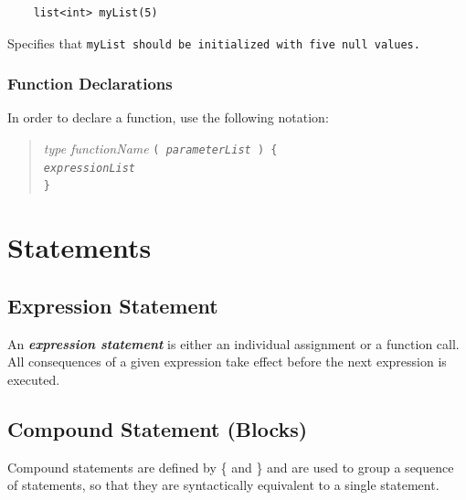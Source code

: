 \documentclass{article}
\begin{document}
\begin{verbatim}
    list<int> myList(5)
\end{verbatim}

Specifies that \tt myList \rm should be initialized with five \tt null \rm values.


\subsubsection{Function Declarations} %
\label{ssub:function_declarations}

In order to declare a function, use the following notation:

\begin{quotation}
\emph{type functionName} \tt ( \rm \emph{parameterList} \tt ) \{ \rm \\
\indent \indent \emph{expressionList} \\
\indent \tt \}
\end{quotation}





\section{Statements} %
\label{sec:statements}

\subsection{Expression Statement} %
\label{sub:expression_statement}

An \textbf{\emph{expression statement}} is either an individual assignment or a
function call. All consequences of a given expression take effect before the next
expression is executed.


\subsection{Compound Statement (Blocks)} %
\label{sub:compound_statement}

Compound statements are defined by \{ and \} and are used to group a sequence of
statements, so that they are syntactically equivalent to a single statement.
\end{document}
